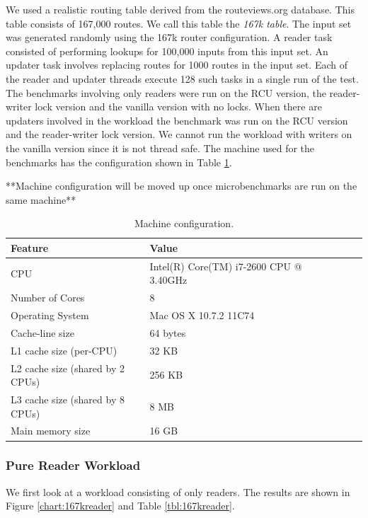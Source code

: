 \documentclass{article}
\begin{document}
We used a realistic routing table derived from the routeviews.org
database. This table consists of 167,000 routes. We call this table
the \emph{167k table}. The input set was generated randomly using the
167k router configuration. A reader task consisted of performing
lookups for 100,000 inputs from this input set. An updater task
involves replacing routes for 1000 routes in the input set. Each of
the reader and updater threads execute 128 such tasks in a single run
of the test.\\

The benchmarks involving only readers were run on the RCU version,
the reader-writer lock version and the vanilla version with no
locks. When there are updaters involved in the workload the benchmark
was run on the RCU version and the reader-writer lock version. We
cannot run the workload with writers on the vanilla version since it
is not thread safe.  The machine used for the benchmarks has the
configuration shown in Table \ref{tbl:machinemac}.


**Machine configuration  will be moved up once microbenchmarks are
run on the same machine**

\begin{table}
\begin{center}
\begin{tabular}{|l|l|l|l|l|l|}
\hline Feature & Value\\
\hline CPU &Intel(R) Core(TM) i7-2600 CPU @ 3.40GHz\\
\hline Number of Cores & 8\\
\hline Operating System & Mac OS X 10.7.2 11C74\\
\hline Cache-line size & 64 bytes\\
\hline L1 cache size (per-CPU) & 32 KB\\
\hline L2 cache size (shared by 2 CPUs) & 256 KB\\
\hline L3 cache size (shared by 8 CPUs)& 8 MB\\
\hline Main memory size & 16 GB\\
\hline
\end{tabular}
\end{center}
\caption{Machine configuration.}
\label{tbl:machinemac}
\end{table}

\subsubsection{Pure Reader Workload}
 We first look at a workload consisting of only readers. The results
 are shown in Figure \ref{chart:167kreader} and Table
 \ref{tbl:167kreader}.\\
\end{document}
